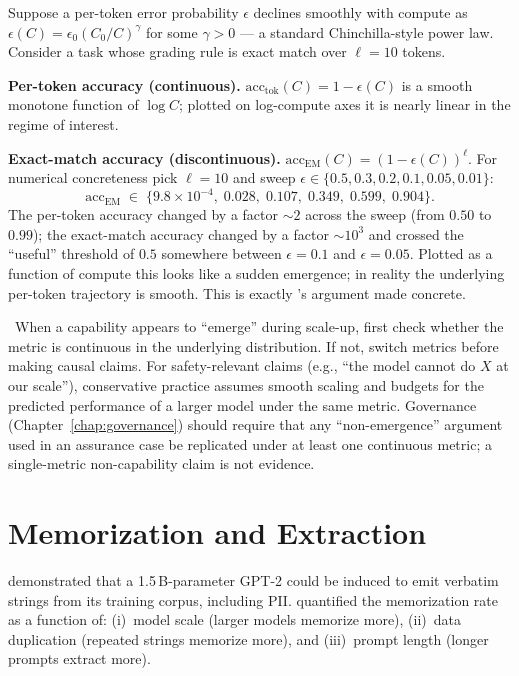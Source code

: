 \begin{workedexample}
Suppose a per-token error probability $\epsilon$ declines smoothly
with compute as $\epsilon(C) = \epsilon_0 (C_0/C)^{\gamma}$ for some
$\gamma > 0$ — a standard Chinchilla-style power law. Consider a
task whose grading rule is exact match over $\ell = 10$ tokens.

\textbf{Per-token accuracy (continuous).}
$\mathrm{acc}_{\mathrm{tok}}(C) = 1 - \epsilon(C)$ is a smooth
monotone function of $\log C$; plotted on log-compute axes it is
nearly linear in the regime of interest.

\textbf{Exact-match accuracy (discontinuous).}
$\mathrm{acc}_{\mathrm{EM}}(C) = (1 - \epsilon(C))^{\ell}$. For
numerical concreteness pick $\ell = 10$ and sweep
$\epsilon \in \{0.5, 0.3, 0.2, 0.1, 0.05, 0.01\}$:
\[
\mathrm{acc}_{\mathrm{EM}} \;\in\;
\{9.8\!\times\!10^{-4},\; 0.028,\; 0.107,\; 0.349,\; 0.599,\; 0.904\}.
\]
The per-token accuracy changed by a factor $\sim 2$ across the sweep
(from $0.50$ to $0.99$); the exact-match accuracy changed by a factor
$\sim 10^{3}$ and crossed the ``useful'' threshold of $0.5$ somewhere
between $\epsilon = 0.1$ and $\epsilon = 0.05$. Plotted as a function
of compute this looks like a sudden emergence; in reality the
underlying per-token trajectory is smooth. This is exactly
\citet{schaeffer2023mirage}'s argument made concrete.
\end{workedexample}

\Cons\ When a capability appears to ``emerge'' during scale-up,
first check whether the metric is continuous in the underlying
distribution. If not, switch metrics before making causal claims.
For safety-relevant claims (e.g., ``the model cannot do $X$ at our
scale''), conservative practice assumes smooth scaling and budgets
for the predicted performance of a larger model under the same
metric. Governance (Chapter~\ref{chap:governance}) should require that any
``non-emergence'' argument used in an assurance case be replicated
under at least one continuous metric; a single-metric
non-capability claim is not evidence.

\section{Memorization and Extraction}

\citet{carlini2021extracting} demonstrated that a 1.5\,B-parameter
GPT-2 could be induced to emit verbatim strings from its training
corpus, including PII. \citet{carlini2023quantifying} quantified the
memorization rate as a function of:
(i)~model scale (larger models memorize more),
(ii)~data duplication (repeated strings memorize more), and
(iii)~prompt length (longer prompts extract more).

